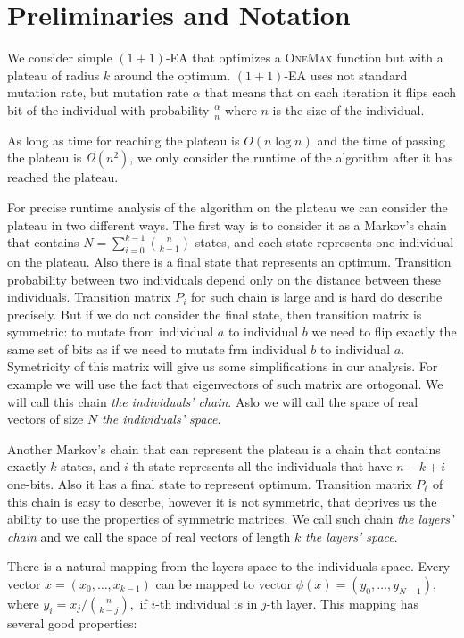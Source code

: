 \documentclass{article}
\newcommand{\OM}{\textsc{OneMax}\xspace}
\begin{document}
\section{Preliminaries and Notation}

We consider simple $(1 + 1)$-EA that optimizes a \OM function but with a plateau of radius $k$ around the optimum. $(1 + 1)$-EA uses not standard mutation rate, but mutation rate $\alpha$ that means that on each iteration it flips each bit of the individual with probability $\frac{\alpha}{n}$ where $n$ is the size of the individual.

As long as time for reaching the plateau is $O(n\log n)$ and the time of passing the plateau is $\Omega(n^2)$, we only consider the runtime of the algorithm after it has reached the plateau.

For precise runtime analysis of the algorithm on the plateau we can consider the plateau in two different ways. The first way is to consider it as a Markov's chain that contains $N = \sum\limits_{i = 0}^{k - 1} \binom{n}{k - 1}$ states, and each state represents one individual on the plateau. Also there is a final state that represents an optimum. Transition probability between two individuals depend only on the distance between these individuals. Transition matrix $P_i$ for such chain is large and is hard do describe precisely. But if we do not consider the final state, then transition matrix is symmetric: to mutate from individual $a$ to individual $b$ we need to flip exactly the same set of bits as if we need to mutate frm individual $b$ to individual $a$. Symetricity of this matrix will give us some simplifications in our analysis. For example we will use the fact that eigenvectors of such matrix are ortogonal. We will call this chain \textit{the individuals' chain}. Aslo we will call the space of real vectors of size $N$ \textit{the individuals' space}.

Another Markov's chain that can represent the plateau is a chain that contains exactly $k$ states, and $i$-th state represents all the individuals that have $n - k + i$ one-bits. Also it has a final state to represent optimum. Transition matrix $P_\ell$ of this chain is easy to descrbe, however it is not symmetric, that deprives us the ability to use the properties of symmetric matrices. We call such chain \textit{the layers' chain} and we call the space of real vectors of length $k$ \textit{the layers' space}.

There is a natural mapping from the layers space to the individuals space. Every vector $x = (x_0, \dots, x_{k - 1})$ can be mapped to vector $\phi(x) = (y_0, \dots, y_{N - 1}),$ where $y_i = x_j / \binom{n}{k - j}, $ if $i$-th individual is in $j$-th layer. This mapping has several good properties:
\end{document}
